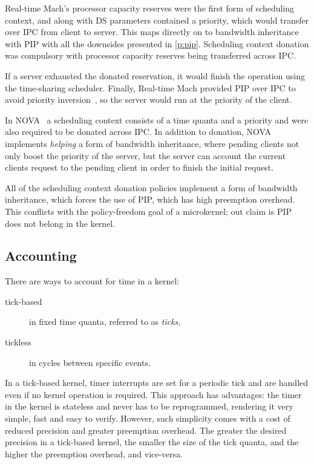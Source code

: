 Real-time Mach's processor capacity reserves were the first form of scheduling context, and along
with \gls{DS} parameters contained a priority, which would transfer over \gls{IPC} from
client to server. This maps directly on to bandwidth inheritance with \gls{PIP} with all the
downsides presented in \cref{p:pip}. Scheduling context donation was compulsory with processor
capacity reserves being transferred across \gls{IPC}.

If a server exhausted the
donated reservation, it would finish the operation using the time-sharing scheduler.  Finally,
Real-time Mach provided \gls{PIP} over \gls{IPC} to avoid priority inversion~\citep{Tokuda_NR_90},
so the server would run at the priority of the client.

In NOVA~\citep{Steinberg_WH_05} a scheduling context consists of a time quanta and a priority
and were also required to be donated across \gls{IPC}. In addition to donation, NOVA implements
\emph{helping} a form of bandwidth inheritance, where pending clients not only boost the priority of
the server, but the server can account the current clients request to the pending client in order to
finish the initial request. 

All of the scheduling context donation policies implement a form of bandwidth inheritance, which
forces the use of \gls{PIP}, which has high preemption overhead. This conflicts with the
policy-freedom goal of a microkernel; out claim is \gls{PIP} does not belong in the kernel. 

\subsection{Accounting}
\label{s:tick-v-tickless}

There are ways to account for time in a kernel:  
\begin{description}
    \item[tick-based] in fixed time quanta, referred to as \emph{ticks},
    \item[tickless] in cycles between specific events. 
\end{description}

In a tick-based kernel, timer interrupts are set for a periodic tick and are handled even if no
kernel operation is required.
This approach has advantages: the timer in the kernel is stateless and never has to be
reprogrammed, rendering it very simple, fast and easy to verify.
However, such simplicity comes with a cost of reduced precision and greater preemption
overhead.
The greater the desired precision in a tick-based kernel, the smaller the size of the tick quanta,
and the higher the preemption overhead, and vice-versa.

